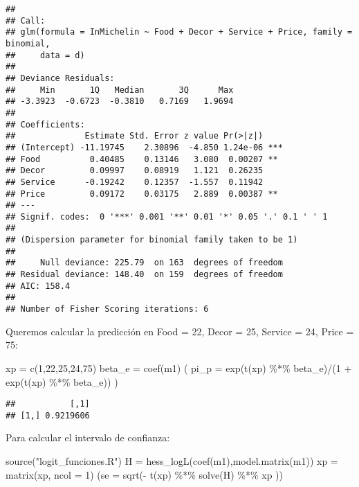 \documentclass[
]{article}
\newenvironment{Shaded}{\begin{snugshade}}{\end{snugshade}}
\newcommand{\AttributeTok}[1]{\textcolor[rgb]{0.77,0.63,0.00}{#1}}
\newcommand{\DecValTok}[1]{\textcolor[rgb]{0.00,0.00,0.81}{#1}}
\newcommand{\FunctionTok}[1]{\textcolor[rgb]{0.00,0.00,0.00}{#1}}
\newcommand{\NormalTok}[1]{#1}
\newcommand{\OtherTok}[1]{\textcolor[rgb]{0.56,0.35,0.01}{#1}}
\newcommand{\SpecialCharTok}[1]{\textcolor[rgb]{0.00,0.00,0.00}{#1}}
\newcommand{\StringTok}[1]{\textcolor[rgb]{0.31,0.60,0.02}{#1}}
\begin{document}
\begin{verbatim}
## 
## Call:
## glm(formula = InMichelin ~ Food + Decor + Service + Price, family = binomial, 
##     data = d)
## 
## Deviance Residuals: 
##     Min       1Q   Median       3Q      Max  
## -3.3923  -0.6723  -0.3810   0.7169   1.9694  
## 
## Coefficients:
##              Estimate Std. Error z value Pr(>|z|)    
## (Intercept) -11.19745    2.30896  -4.850 1.24e-06 ***
## Food          0.40485    0.13146   3.080  0.00207 ** 
## Decor         0.09997    0.08919   1.121  0.26235    
## Service      -0.19242    0.12357  -1.557  0.11942    
## Price         0.09172    0.03175   2.889  0.00387 ** 
## ---
## Signif. codes:  0 '***' 0.001 '**' 0.01 '*' 0.05 '.' 0.1 ' ' 1
## 
## (Dispersion parameter for binomial family taken to be 1)
## 
##     Null deviance: 225.79  on 163  degrees of freedom
## Residual deviance: 148.40  on 159  degrees of freedom
## AIC: 158.4
## 
## Number of Fisher Scoring iterations: 6
\end{verbatim}

Queremos calcular la predicción en Food = 22, Decor = 25, Service = 24,
Price = 75:

\begin{Shaded}
\begin{Highlighting}[]
\NormalTok{xp }\OtherTok{=} \FunctionTok{c}\NormalTok{(}\DecValTok{1}\NormalTok{,}\DecValTok{22}\NormalTok{,}\DecValTok{25}\NormalTok{,}\DecValTok{24}\NormalTok{,}\DecValTok{75}\NormalTok{)}
\NormalTok{beta\_e }\OtherTok{=} \FunctionTok{coef}\NormalTok{(m1)}
\NormalTok{( }\AttributeTok{pi\_p =} \FunctionTok{exp}\NormalTok{(}\FunctionTok{t}\NormalTok{(xp) }\SpecialCharTok{\%*\%}\NormalTok{ beta\_e)}\SpecialCharTok{/}\NormalTok{(}\DecValTok{1} \SpecialCharTok{+} \FunctionTok{exp}\NormalTok{(}\FunctionTok{t}\NormalTok{(xp) }\SpecialCharTok{\%*\%}\NormalTok{ beta\_e)) ) }
\end{Highlighting}
\end{Shaded}

\begin{verbatim}
##           [,1]
## [1,] 0.9219606
\end{verbatim}

Para calcular el intervalo de confianza:

\begin{Shaded}
\begin{Highlighting}[]
\FunctionTok{source}\NormalTok{(}\StringTok{"logit\_funciones.R"}\NormalTok{)}
\NormalTok{H }\OtherTok{=} \FunctionTok{hess\_logL}\NormalTok{(}\FunctionTok{coef}\NormalTok{(m1),}\FunctionTok{model.matrix}\NormalTok{(m1))}
\NormalTok{xp }\OtherTok{=} \FunctionTok{matrix}\NormalTok{(xp, }\AttributeTok{ncol =} \DecValTok{1}\NormalTok{)}
\NormalTok{(}\AttributeTok{se =} \FunctionTok{sqrt}\NormalTok{(}\SpecialCharTok{{-}} \FunctionTok{t}\NormalTok{(xp) }\SpecialCharTok{\%*\%} \FunctionTok{solve}\NormalTok{(H) }\SpecialCharTok{\%*\%}\NormalTok{ xp ))}
\end{Highlighting}
\end{Shaded}
\end{document}
